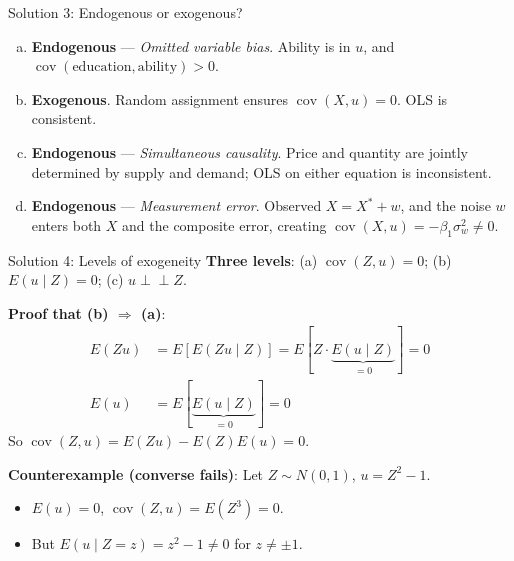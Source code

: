 \documentclass[10pt]{beamer}
\begin{document}
\begin{frame}{Solution 3: Endogenous or exogenous?}
\label{s3}
\begin{enumerate}[(a)]
  \item \textbf{Endogenous} --- \emph{Omitted variable bias}. Ability is in $u$, and $\operatorname{cov}(\text{education}, \text{ability}) > 0$.

  \item \textbf{Exogenous}. Random assignment ensures $\operatorname{cov}(X, u) = 0$. OLS is consistent.

  \item \textbf{Endogenous} --- \emph{Simultaneous causality}. Price and quantity are jointly determined by supply and demand; OLS on either equation is inconsistent.

  \item \textbf{Endogenous} --- \emph{Measurement error}. Observed $X = X^* + w$, and the noise $w$ enters both $X$ and the composite error, creating $\operatorname{cov}(X, u) = -\beta_1\sigma_w^2 \neq 0$.
\end{enumerate}

\vfill
\hfill\hyperlink{q3}{}
\end{frame}

\begin{frame}{Solution 4: Levels of exogeneity}
\label{s4}
\textbf{Three levels}: (a) $\operatorname{cov}(Z,u)=0$; \quad (b) $E(u\mid Z)=0$; \quad (c) $u \perp\!\!\!\perp Z$.

\textbf{Proof that (b) $\Rightarrow$ (a)}:
\begin{align*}
E(Zu) &= E[E(Zu \mid Z)] = E[Z \cdot \underbrace{E(u \mid Z)}_{=0}] = 0 \\
E(u) &= E[\underbrace{E(u \mid Z)}_{=0}] = 0
\end{align*}
So $\operatorname{cov}(Z,u) = E(Zu) - E(Z)E(u) = 0$.

\textbf{Counterexample (converse fails)}: Let $Z \sim N(0,1)$, $u = Z^2 - 1$.
\begin{itemize}
  \item $E(u) = 0$, $\operatorname{cov}(Z,u) = E(Z^3) = 0$. \checkmark
  \item But $E(u \mid Z = z) = z^2 - 1 \neq 0$ for $z \neq \pm 1$. 
\end{itemize}

\vfill
\hfill\hyperlink{q4}{}
\end{frame}
\end{document}
